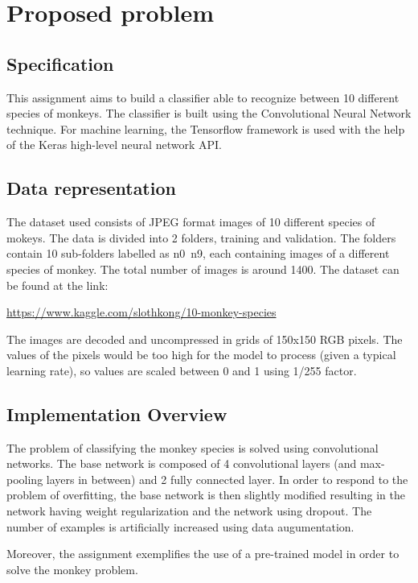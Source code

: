 \documentclass[a4paper,10pt]{article}
\begin{document}
 \section{Proposed problem}
  \subsection{Specification} 
  
  \quad This assignment aims to build a classifier able to recognize between 10 different species of monkeys. The classifier is built using the Convolutional Neural Network technique. For machine learning, the Tensorflow framework is used with the help of the Keras high-level neural network API.
  
    \subsection{Data representation}
  
   \quad The dataset used consists of JPEG format images of 10 different species of mokeys. The data is divided into 2 folders, training and validation. The folders contain 10 sub-folders labelled as n0~n9, each  containing images of a different species of monkey. The total number of images is around 1400. The dataset can be found at the link:
   
   \url{https://www.kaggle.com/slothkong/10-monkey-species}
   
   \quad The images are decoded and uncompressed in grids of 150x150 RGB pixels. The values of the pixels would be too high for the model to process (given a typical learning rate), so values are scaled between 0 and 1 using 1/255 factor.
   
  
  \subsection{Implementation Overview} 
  \quad The problem of classifying the monkey species is solved using convolutional networks. The base network is composed of 4 convolutional layers (and max-pooling layers in between) and 2 fully connected layer. In order to respond to the problem of overfitting, the base network is then slightly modified resulting in the network having weight regularization and the network using dropout. The number of examples is artificially increased using data augumentation. 
  
  \quad Moreover, the assignment exemplifies the use of a pre-trained model in order to solve the monkey problem.
  
\end{document}
